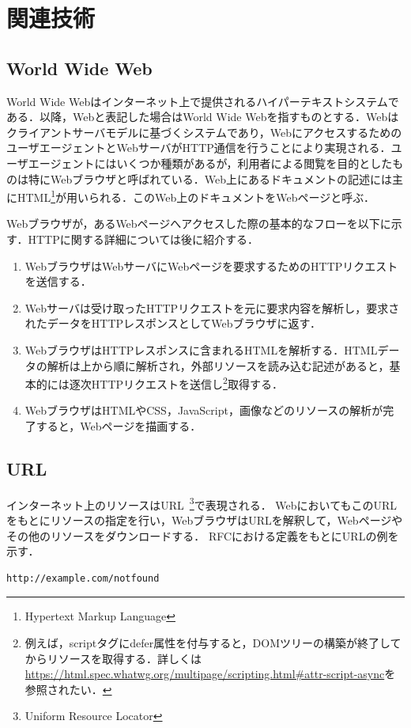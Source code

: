 \newpage
\section{関連技術}
\subsection{World Wide Web}
World Wide Webはインターネット上で提供されるハイパーテキストシステムである．以降，Webと表記した場合はWorld Wide Webを指すものとする．Webはクライアントサーバモデルに基づくシステムであり，WebにアクセスするためのユーザエージェントとWebサーバがHTTP通信を行うことにより実現される．ユーザエージェントにはいくつか種類があるが，利用者による閲覧を目的としたものは特にWebブラウザと呼ばれている．Web上にあるドキュメントの記述には主にHTML\footnote{Hypertext Markup Language}が用いられる．このWeb上のドキュメントをWebページと呼ぶ．

Webブラウザが，あるWebページへアクセスした際の基本的なフローを以下に示す．HTTPに関する詳細については後に紹介する．

\begin{enumerate}
\item WebブラウザはWebサーバにWebページを要求するためのHTTPリクエストを送信する．
\item Webサーバは受け取ったHTTPリクエストを元に要求内容を解析し，要求されたデータをHTTPレスポンスとしてWebブラウザに返す．
\item WebブラウザはHTTPレスポンスに含まれるHTMLを解析する．HTMLデータの解析は上から順に解析され，外部リソースを読み込む記述があると，基本的には逐次HTTPリクエストを送信し\footnote{例えば，scriptタグにdefer属性を付与すると，DOMツリーの構築が終了してからリソースを取得する．詳しくは\url{https://html.spec.whatwg.org/multipage/scripting.html\#attr-script-async}を参照されたい．}取得する．
\item WebブラウザはHTMLやCSS，JavaScript，画像などのリソースの解析が完了すると，Webページを描画する．
\end{enumerate}

\subsection{URL}
インターネット上のリソースはURL~\cite{rfc1738,rfc3986,url_ls}\footnote{Uniform Resource Locator}で表現される．
WebにおいてもこのURLをもとにリソースの指定を行い，WebブラウザはURLを解釈して，Webページやその他のリソースをダウンロードする．
RFCにおける定義をもとにURLの例を示す．

\begin{verbatim}
http://example.com/notfound
\end{verbatim}

